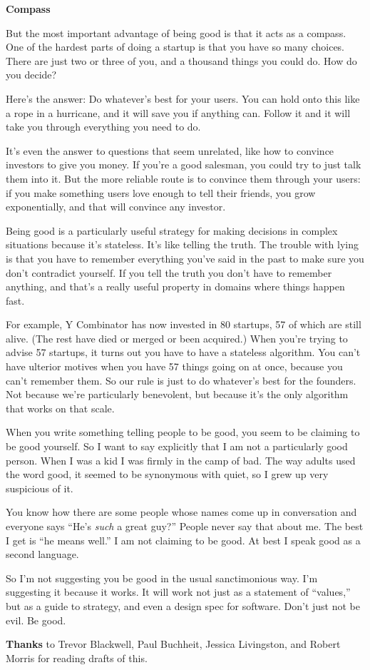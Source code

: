 \textbf{Compass}

But the most important advantage of being good is that it acts as a
compass. One of the hardest parts of doing a startup is that you have so
many choices. There are just two or three of you, and a thousand things
you could do. How do you decide?

Here's the answer: Do whatever's best for your users. You can hold onto
this like a rope in a hurricane, and it will save you if anything can.
Follow it and it will take you through everything you need to do.

It's even the answer to questions that seem unrelated, like how to
convince investors to give you money. If you're a good salesman, you
could try to just talk them into it. But the more reliable route is to
convince them through your users: if you make something users love
enough to tell their friends, you grow exponentially, and that will
convince any investor.

Being good is a particularly useful strategy for making decisions in
complex situations because it's stateless. It's like telling the truth.
The trouble with lying is that you have to remember everything you've
said in the past to make sure you don't contradict yourself. If you tell
the truth you don't have to remember anything, and that's a really
useful property in domains where things happen fast.

For example, Y Combinator has now invested in 80 startups, 57 of which
are still alive. (The rest have died or merged or been acquired.) When
you're trying to advise 57 startups, it turns out you have to have a
stateless algorithm. You can't have ulterior motives when you have 57
things going on at once, because you can't remember them. So our rule is
just to do whatever's best for the founders. Not because we're
particularly benevolent, but because it's the only algorithm that works
on that scale.

When you write something telling people to be good, you seem to be
claiming to be good yourself. So I want to say explicitly that I am not
a particularly good person. When I was a kid I was firmly in the camp of
bad. The way adults used the word good, it seemed to be synonymous with
quiet, so I grew up very suspicious of it.

You know how there are some people whose names come up in conversation
and everyone says ``He's \emph{such} a great guy?'' People never say
that about me. The best I get is ``he means well.'' I am not claiming to
be good. At best I speak good as a second language.

So I'm not suggesting you be good in the usual sanctimonious way. I'm
suggesting it because it works. It will work not just as a statement of
``values,'' but as a guide to strategy, and even a design spec for
software. Don't just not be evil. Be good.


\textbf{Thanks} to Trevor Blackwell, Paul Buchheit, Jessica Livingston,
and Robert Morris for reading drafts of this.